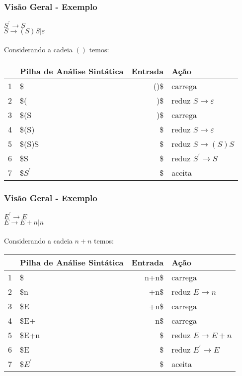 \documentclass[table]{beamer}
\begin{document}
\begin{frame}
   \frametitle{Visão Geral - Exemplo}
   $S^{'}\to S$ \\
   $S\to(S)S|\varepsilon$ \\
   \\
   Considerando a cadeia $()$ temos:

   \begin{table}
      \begin{tabular}{|c|l|r|l|}
      \hline
      & Pilha de Análise Sintática & Entrada & Ação \\
      \hline 
      1 & \$        & ()\$ & carrega                         \\
      2 & \$(       &  )\$ & reduz $S\to\varepsilon$         \\
      3 & \$(S      &  )\$ & carrega                         \\
      4 & \$(S)     &   \$ & reduz $S\to\varepsilon$         \\
      5 & \$(S)S    &   \$ & reduz $S\to(S)S$                \\
      6 & \$S       &   \$ & reduz $S^{'}\to S$              \\
      7 & \$$S^{'}$ &   \$ & aceita                          \\
      \hline
      \end{tabular}
   \end{table}
\end{frame}

\begin{frame}
   \frametitle{Visão Geral - Exemplo}
   $E^{'}\to E$ \\
   $E\to E+n|n$ \\
   \\
   Considerando a cadeia $n+n$ temos:

   \begin{table}
      \begin{tabular}{|c|l|r|l|}
      \hline
      & Pilha de Análise Sintática & Entrada & Ação \\
      \hline 
      1 & \$        & n+n\$ & carrega                         \\
      2 & \$n       &  +n\$ & reduz $E\to n$         \\
      3 & \$E       &  +n\$ & carrega                         \\
      4 & \$E+      &   n\$ & carrega   \\
      5 & \$E+n     &    \$ & reduz $E\to E + n$                \\
      6 & \$E       &    \$ & reduz $E^{'}\to E$              \\
      7 & \$$E^{'}$ &    \$ & aceita                          \\
      \hline
      \end{tabular}
   \end{table}
\end{frame}
\end{document}
